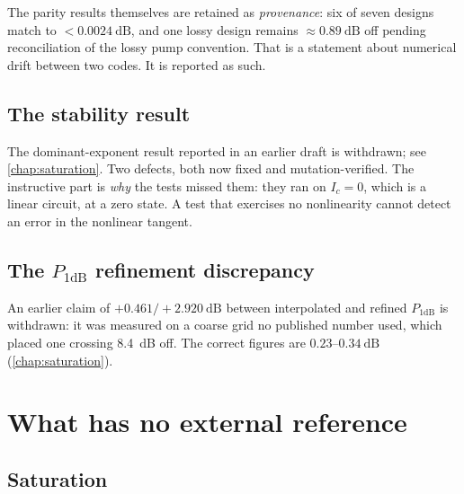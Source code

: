 The parity results themselves are retained as \emph{provenance}: six of seven
designs match to $<\SI{0.0024}{\dB}$, and one lossy design remains
$\approx\SI{0.89}{\dB}$ off pending reconciliation of the lossy pump convention.
That is a statement about numerical drift between two codes. It is reported as
such.

\subsection{The stability result}

The dominant-exponent result reported in an earlier draft is withdrawn; see
\cref{chap:saturation}. Two defects, both now fixed and mutation-verified.
The instructive part is \emph{why} the tests missed them: they ran on $I_c=0$,
which is a linear circuit, at a zero state. A test that exercises no
nonlinearity cannot detect an error in the nonlinear tangent.

\subsection{\texorpdfstring{The $P_{1\mathrm{dB}}$ refinement discrepancy}
                          {The P1dB refinement discrepancy}}

An earlier claim of $+0.461/+\SI{2.920}{\dB}$ between interpolated and refined
$P_{1\mathrm{dB}}$ is withdrawn: it was measured on a coarse grid no published
number used, which placed one crossing \SI{8.4}{\dB} off. The correct figures
are $0.23$--$\SI{0.34}{\dB}$ (\cref{chap:saturation}).

\section{What has no external reference}

\subsection{Saturation}

